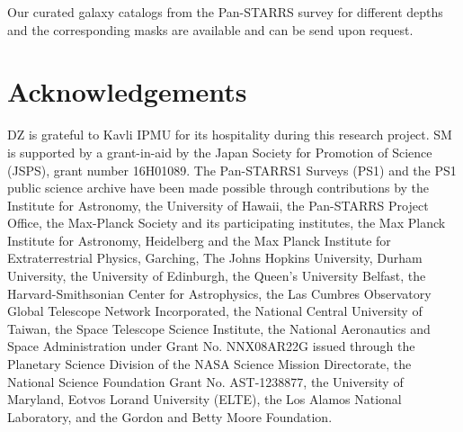 \documentclass[iop, apjl, twocolappendix, numberedappendix]{emulateapj}
\begin{document}
Our curated galaxy catalogs from the Pan-STARRS survey for different
depths and the corresponding masks are available and can be send
upon request.



\section*{Acknowledgements}
DZ is grateful to Kavli IPMU for its hospitality during this
research project. SM is supported by a grant-in-aid by the Japan
Society for Promotion of Science (JSPS), grant number 16H01089.
The Pan-STARRS1 Surveys (PS1) and the PS1 public science archive
have been made possible through contributions by the Institute for
Astronomy, the University of Hawaii, the Pan-STARRS Project Office,
the Max-Planck Society and its participating institutes, the Max
Planck Institute for Astronomy, Heidelberg and the Max Planck
Institute for Extraterrestrial Physics, Garching, The Johns Hopkins
University, Durham University, the University of Edinburgh, the
Queen's University Belfast, the Harvard-Smithsonian Center for
Astrophysics, the Las Cumbres Observatory Global Telescope Network
Incorporated, the National Central University of Taiwan, the Space
Telescope Science Institute, the National Aeronautics and Space
Administration under Grant No. NNX08AR22G issued through the
Planetary Science Division of the NASA Science Mission Directorate,
the National Science Foundation Grant No. AST-1238877, the
University of Maryland, Eotvos Lorand University (ELTE), the Los
Alamos National Laboratory, and the Gordon and Betty Moore
Foundation.
\end{document}
